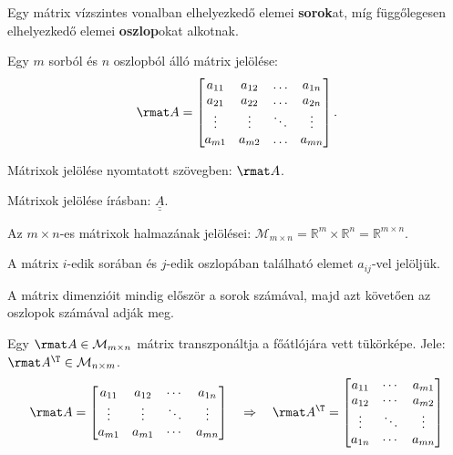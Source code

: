 \documentclass[a4paper, 12pt]{scrartcl}
\begin{document}
\begin{definition}[Mátrix]
  Egy mátrix vízszintes vonalban elhelyezkedő elemei \textbf{sorok}at,
  míg függőlegesen elhelyezkedő elemei \textbf{oszlop}okat alkotnak.

  Egy $m$ sorból és $n$ oszlopból álló mátrix jelölése:
  $$
    \rmat A = \begin{bmatrix}
      a_{11} & a_{12} & \ldots & a_{1n} \\
      a_{21} & a_{22} & \ldots & a_{2n} \\
      \vdots & \vdots & \ddots & \vdots \\
      a_{m1} & a_{m2} & \ldots & a_{mn}
    \end{bmatrix}
    \text.
  $$

  Mátrixok jelölése nyomtatott szövegben: $\rmat A$.

  Mátrixok jelölése írásban: $\underline{\underline A}$.

  Az $m \times n$-es mátrixok halmazának jelölései: $\mathcal M_{m \times n}
    = \mathbb R^m \times \mathbb R^n = \mathbb R^{m \times n}$.

  A mátrix $i$-edik sorában és $j$-edik oszlopában található elemet
  $a_{ij}$-vel jelöljük.
\end{definition}

\begin{note}
  A mátrix dimenzióit mindig először a sorok számával, majd azt követően az
  oszlopok számával adják meg.
\end{note}

\begin{definition}
  Egy $\rmat A \in \mathcal M_{m \times n}$ mátrix transzponáltja a főátlójára
  vett tükörképe. Jele: $\rmat A^\T \in \mathcal M_{n \times m}$.
  $$
    \rmat A = \begin{bmatrix}
      a_{11} & a_{12} & \cdots & a_{1n} \\
      \vdots & \vdots & \ddots & \vdots \\
      a_{m1} & a_{m1} & \cdots & a_{mn}
    \end{bmatrix}
    \quad \Rightarrow \quad
    \rmat A^\T = \begin{bmatrix}
      a_{11} & \cdots & a_{m1} \\
      a_{12} & \cdots & a_{m2} \\
      \vdots & \ddots & \vdots \\
      a_{1n} & \cdots & a_{mn}
    \end{bmatrix}
  $$
\end{definition}
\end{document}
